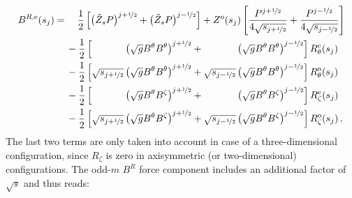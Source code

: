 \begin{align}
  B^{R,\mathrm{e}} (s_j)
  =&\, \phantom{-}~ \frac{1}{2} \left[ \left( \tilde{Z}_s P \right)^{j+\half} + \left( \tilde{Z}_s P \right)^{j-\half} \right]
    + Z^o(s_j) \left[ \frac{P^{j+\half}}{4 \sqrt{s_{j+\half}}}  + \frac{P^{j-\half}}{4 \sqrt{s_{j-\half}}}  \right] \nonumber \\
  ~&\, - \frac{1}{2} \left[   \phantom{\sqrt{s_{j+\half}}} \left( \sqrt{g} B^\theta B^\theta \right)^{j+\half}
                            + \phantom{\sqrt{s_{j-\half}}} \left( \sqrt{g} B^\theta B^\theta \right)^{j-\half} \right] R_\theta^\mathrm{e}(s_j) \nonumber \\
  ~&\, - \frac{1}{2} \left[            \sqrt{s_{j+\half}}  \left( \sqrt{g} B^\theta B^\theta \right)^{j+\half}
                            +          \sqrt{s_{j-\half}}  \left( \sqrt{g} B^\theta B^\theta \right)^{j-\half} \right] R_\theta^\mathrm{o}(s_j) \nonumber \\
  ~&\, - \frac{1}{2} \left[   \phantom{\sqrt{s_{j+\half}}} \left( \sqrt{g} B^\theta  B^\zeta \right)^{j+\half}
                            + \phantom{\sqrt{s_{j-\half}}} \left( \sqrt{g} B^\theta  B^\zeta \right)^{j-\half} \right]  R_\zeta^\mathrm{e}(s_j) \nonumber \\
  ~&\, - \frac{1}{2} \left[            \sqrt{s_{j+\half}}  \left( \sqrt{g} B^\theta  B^\zeta \right)^{j+\half}
                            +          \sqrt{s_{j-\half}}  \left( \sqrt{g} B^\theta  B^\zeta \right)^{j-\half} \right]  R_\zeta^\mathrm{o}(s_j) \label{eqn:brmn_e} \, .
\end{align}
The last two terms are only taken into account in case of a three-dimensional configuration,
since $R_\zeta$ is zero in axisymmetric (or two-dimensional) configurations.
The odd-$m$ $B^R$ force component includes an additional factor of $\sqrt{s}$
and thus reads:
